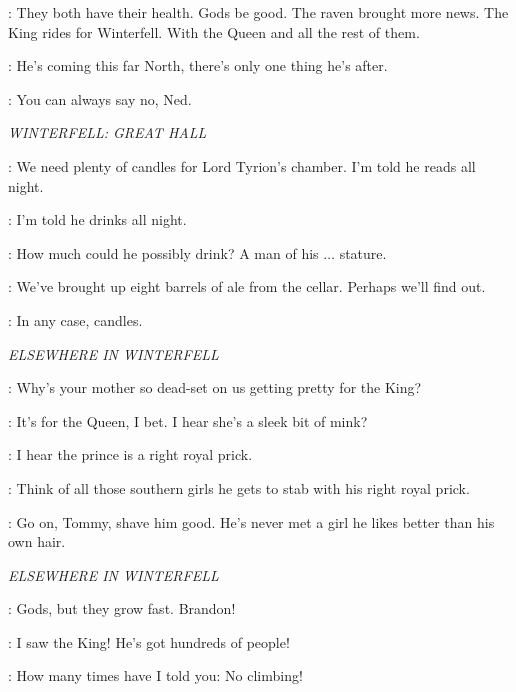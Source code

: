 \CATELYN: They both have their health. Gods be good. The raven brought more news. The King rides for Winterfell. With the Queen and all the rest of them. 

\NED: He's coming this far North, there's only one thing he's after. 

\CATELYN: You can always say no, Ned. 


\scene

\textit{WINTERFELL: GREAT HALL} 


\CATELYN: We need plenty of candles for Lord Tyrion's chamber. I'm told he reads all night. 

\LUWIN: I'm told he drinks all night. 

\CATELYN: How much could he possibly drink? A man of his $\ldots$ stature. 

\LUWIN: We've brought up eight barrels of ale from the cellar. Perhaps we'll find out. 

\CATELYN: In any case, candles. 


\scene

\textit{ELSEWHERE IN WINTERFELL} 


\JON:  Why's your mother so dead-set on us getting pretty for the King? 

\THEON: It's for the Queen, I bet. I hear she's a sleek bit of mink? 

\ROBB: I hear the prince is a right royal prick. 

\THEON: Think of all those southern girls he gets to stab with his right royal prick. 

\ROBB: Go on, Tommy, shave him good. He's never met a girl he likes better than his own hair. 


\scene

\textit{ELSEWHERE IN WINTERFELL} 


\CATELYN: Gods, but they grow fast.  Brandon! 

\BRAN: I saw the King! He's got hundreds of people! 

\CATELYN: How many times have I told you: No climbing! 


